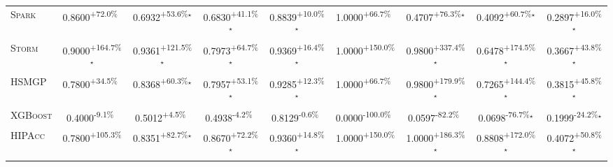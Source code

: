 \begin{table}[htbp]
\begin{tabular}{l|cccc|cccc}
\textsc{Spark} & \cellcolor{green!30}0.8600\textsuperscript{+72.0\%}$^{\,\,\,}$ & \cellcolor{green!30}0.6932\textsuperscript{+53.6\%}$^\star$ & \cellcolor{green!30}0.6830\textsuperscript{+41.1\%}$^\star$ & \cellcolor{green!30}0.8839\textsuperscript{+10.0\%}$^\star$ & \cellcolor{green!30}1.0000\textsuperscript{+66.7\%}$^{\,\,\,}$ & \cellcolor{green!30}0.4707\textsuperscript{+76.3\%}$^\star$ & \cellcolor{green!30}0.4092\textsuperscript{+60.7\%}$^\star$ & \cellcolor{green!30}0.2897\textsuperscript{+16.0\%}$^\star$ \\
\textsc{Storm} & \cellcolor{green!30}0.9000\textsuperscript{+164.7\%}$^\star$ & \cellcolor{green!30}0.9361\textsuperscript{+121.5\%}$^\star$ & \cellcolor{green!30}0.7973\textsuperscript{+64.7\%}$^\star$ & \cellcolor{green!30}0.9369\textsuperscript{+16.4\%}$^\star$ & \cellcolor{green!30}1.0000\textsuperscript{+150.0\%}$^{\,\,\,}$ & \cellcolor{green!30}0.9800\textsuperscript{+337.4\%}$^\star$ & \cellcolor{green!30}0.6478\textsuperscript{+174.5\%}$^\star$ & \cellcolor{green!30}0.3667\textsuperscript{+43.8\%}$^\star$ \\
\textsc{HSMGP} & \cellcolor{green!30}0.7800\textsuperscript{+34.5\%}$^{\,\,\,}$ & \cellcolor{green!30}0.8368\textsuperscript{+60.3\%}$^\star$ & \cellcolor{green!30}0.7957\textsuperscript{+53.1\%}$^\star$ & \cellcolor{green!30}0.9285\textsuperscript{+12.3\%}$^\star$ & \cellcolor{green!30}1.0000\textsuperscript{+66.7\%}$^{\,\,\,}$ & \cellcolor{green!30}0.9800\textsuperscript{+179.9\%}$^\star$ & \cellcolor{green!30}0.7265\textsuperscript{+144.4\%}$^\star$ & \cellcolor{green!30}0.3815\textsuperscript{+45.8\%}$^\star$ \\
\textsc{XGBoost} & \cellcolor{red!30}0.4000\textsuperscript{-9.1\%}$^{\,\,\,}$ & \cellcolor{green!30}0.5012\textsuperscript{+4.5\%}$^{\,\,\,}$ & \cellcolor{red!30}0.4938\textsuperscript{-4.2\%}$^{\,\,\,}$ & \cellcolor{red!30}0.8129\textsuperscript{-0.6\%}$^{\,\,\,}$ & \cellcolor{red!30}0.0000\textsuperscript{-100.0\%}$^{\,\,\,}$ & \cellcolor{red!30}0.0597\textsuperscript{-82.2\%}$^{\,\,\,}$ & \cellcolor{red!30}0.0698\textsuperscript{-76.7\%}$^\star$ & \cellcolor{red!30}0.1999\textsuperscript{-24.2\%}$^\star$ \\
\textsc{HIPAcc} & \cellcolor{green!30}0.7800\textsuperscript{+105.3\%}$^{\,\,\,}$ & \cellcolor{green!30}0.8351\textsuperscript{+82.7\%}$^\star$ & \cellcolor{green!30}0.8670\textsuperscript{+72.2\%}$^\star$ & \cellcolor{green!30}0.9360\textsuperscript{+14.8\%}$^\star$ & \cellcolor{green!30}1.0000\textsuperscript{+150.0\%}$^{\,\,\,}$ & \cellcolor{green!30}1.0000\textsuperscript{+186.3\%}$^\star$ & \cellcolor{green!30}0.8808\textsuperscript{+172.0\%}$^\star$ & \cellcolor{green!30}0.4072\textsuperscript{+50.8\%}$^\star$ \\

\end{tabular}
\end{table}
